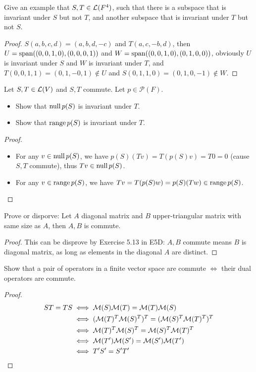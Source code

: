 \documentclass[../main.tex]{subfiles}
\begin{document}
\begin{exercise}
  Give an example that $S, T \in \mathcal{L}(F^4)$, such that there is a subspace
  that is invariant under $S$ but not $T$, and another subspace that is invariant under $T$ but not $S$.
\end{exercise}
\begin{proof}
  $S(a, b, c, d) = (a, b, d, -c)$ and $T(a, c, -b, d)$,
  then $U = \operatorname{span}((0, 0, 1, 0), (0, 0, 0, 1))$ and $W = \operatorname{span}((0, 0, 1, 0), (0, 1, 0, 0))$,
  obviously $U$ is invariant under $S$ and $W$ is invariant under $T$,
  and $T(0, 0, 1, 1) = (0, 1, -0, 1) \notin U$ and $S(0, 1, 1, 0) = (0, 1, 0, -1) \notin W$.
\end{proof}

\setcounter{exercise}{2}
\begin{exercise}
  Let $S, T \in \mathcal{L}(V)$ and $S, T$ commute. Let $p \in \mathcal{P}(F)$.
  \begin{itemize}
    \item Show that $\operatorname{null} p(S)$ is invariant under $T$.
    \item Show that $\operatorname{range} p(S)$ is invariant under $T$.
  \end{itemize}
\end{exercise}
\begin{proof}
  ~
  \begin{itemize}
    \item For any $v \in \operatorname{null} p(S)$, we have $p(S)(Tv) = T(p(S)v) = T0 = 0$ (cause $S, T$ commute),
          thus $Tv \in \operatorname{null} p(S)$.
    \item For any $v \in \operatorname{range} p(S)$, we have $Tv = T(p(S)w) = p(S)(Tw) \in \operatorname{range} p(S)$.
  \end{itemize}
\end{proof}

\begin{exercise}
  Prove or disporve: Let $A$ diagonal matrix and $B$ upper-triangular matrix with same size as $A$,
  then $A, B$ is commute.
\end{exercise}
\begin{proof}
  This can be disprove by Exercise 5.13 in E5D: $A, B$ commute means $B$
  is diagonal matrix, as long as elements in the diagonal $A$ are distinct.
\end{proof}

\begin{exercise}
  Show that a pair of operators in a finite vector space
  are commute $\iff$ their dual operators are commute.
\end{exercise}
\begin{proof}
  ~
  \begin{align*}
    ST = TS & \iff \mathcal{M}(S)\mathcal{M}(T) = \mathcal{M}(T)\mathcal{M}(S) \\
            & \iff (\mathcal{M}(T)^T\mathcal{M}(S)^T)^T = (\mathcal{M}(S)^T\mathcal{M}(T)^T)^T \\
            & \iff \mathcal{M}(T)^T\mathcal{M}(S)^T = \mathcal{M}(S)^T\mathcal{M}(T)^T \\
            & \iff \mathcal{M}(T^\prime)\mathcal{M}(S^\prime) = \mathcal{M}(S^\prime)\mathcal{M}(T^\prime) \\
            & \iff T^\prime S^\prime = S^\prime T^\prime
  \end{align*}
\end{proof}
\end{document}
